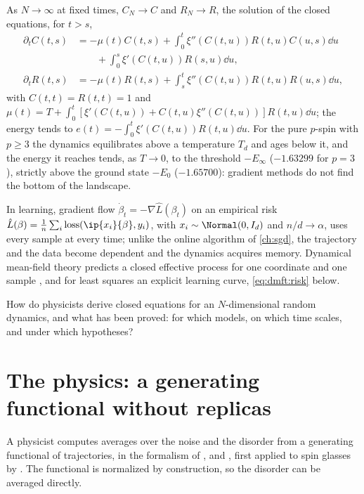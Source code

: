 \begin{refsection}
\begin{physicsbox}
As $N\to\infty$ at fixed times, $C_N\to C$ and $R_N\to R$, the solution of the closed equations, for $t>s$,
\begin{equation}\label{eq:dmft:ck}
\begin{aligned}
\partial_tC(t,s)&=-\mu(t)C(t,s)+\int_0^t\xi''(C(t,u))R(t,u)C(u,s)\dd u\\
&\qquad+\int_0^s\xi'(C(t,u))R(s,u)\dd u,\\
\partial_tR(t,s)&=-\mu(t)R(t,s)+\int_s^t\xi''(C(t,u))R(t,u)R(u,s)\dd u,
\end{aligned}
\end{equation}
with $C(t,t)=R(t,t)=1$ and $\mu(t)=T+\int_0^t[\xi'(C(t,u))+C(t,u)\xi''(C(t,u))]R(t,u)\dd u$; the energy tends to $e(t)=-\int_0^t\xi'(C(t,u))R(t,u)\dd u$. For the pure $p$-spin with $p\ge3$ the dynamics equilibrates above a temperature $T_d$ and ages below it, and the energy it reaches tends, as $T\to0$, to the threshold $-E_\infty$ ($-1.63299$ for $p=3$), strictly above the ground state $-E_0$ ($-1.65700$): gradient methods do not find the bottom of the landscape.
\end{physicsbox}

In learning, gradient flow $\dot\beta_t=-\nabla\hat L(\beta_t)$ on an empirical risk $\hat L(\beta)=\frac1n\sum_i\mathrm{loss}(\ip{x_i}{\beta},y_i)$, with $x_i\sim\Normal(0,I_d)$ and $n/d\to\alpha$, uses every sample at every time; unlike the online algorithm of \cref{ch:sgd}, the trajectory and the data become dependent and the dynamics acquires memory. Dynamical mean-field theory predicts a closed effective process for one coordinate and one sample \parencite{AgoritsasEtAl2018,MignaccoEtAl2021a}, and for least squares an explicit learning curve, \eqref{eq:dmft:risk} below.

How do physicists derive closed equations for an $N$-dimensional random dynamics, and what has been proved: for which models, on which time scales, and under which hypotheses?

\section{The physics: a generating functional without replicas}\label{sec:dmft:physics}

A physicist computes averages over the noise and the disorder from a generating functional of trajectories, in the formalism of \textcite{MartinSiggiaRose1973}, \textcite{Janssen1976} and \textcite{DeDominicis1976}, first applied to spin glasses by \textcite{SompolinskyZippelius1981}. The functional is normalized by construction, so the disorder can be averaged directly.


\end{refsection}
